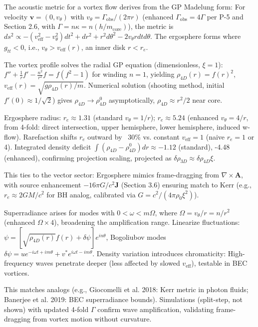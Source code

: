 \documentclass{article}
\begin{document}
The acoustic metric for a vortex flow derives from the GP Madelung form: For velocity $\mathbf{v} = (0, v_\theta)$ with $v_\theta = \Gamma_{\text{obs}} / (2\pi r)$ (enhanced $\Gamma_{\text{obs}} = 4 \Gamma$ per P-5 and Section 2.6, with $\Gamma = n \kappa = n (h / m_{\text{core}})$), the metric is $ds^2 \propto - (v_{\text{eff}}^2 - v_\theta^2) dt^2 + dr^2 + r^2 d\theta^2 - 2 v_\theta r dt d\theta$. The ergosphere forms where $g_{tt} < 0$, i.e., $v_\theta > v_{\text{eff}}(r)$, an inner disk $r < r_e$.

The vortex profile solves the radial GP equation (dimensionless, $\xi = 1$): $f'' + \frac{1}{r} f' - \frac{n^2}{r^2} f = f (f^2 - 1)$ for winding $n=1$, yielding $\rho_{4D}(r) = f(r)^2$, $v_{\text{eff}}(r) = \sqrt{g \rho_{4D}(r) / m}$. Numerical solution (shooting method, initial $f'(0) \approx 1/\sqrt{2}$) gives $\rho_{4D} \to \rho_{4D}^0$ asymptotically, $\rho_{4D} \approx r^2 / 2$ near core.

Ergosphere radius: $r_e \approx 1.31$ (standard $v_\theta = 1/r$); $r_e \approx 5.24$ (enhanced $v_\theta = 4/r$, from 4-fold: direct intersection, upper hemisphere, lower hemisphere, induced w-flow). Rarefaction shifts $r_e$ outward by ~30\% vs. constant $v_{\text{eff}}=1$ (naive $r_e=1$ or 4). Integrated density deficit $\int (\rho_{4D} - \rho_{4D}^0) dr \approx -1.12$ (standard), -4.48 (enhanced), confirming projection scaling, projected as $\delta \rho_{3D} \approx \delta \rho_{4D} \xi$.

This ties to the vector sector: Ergosphere mimics frame-dragging from $\nabla \times \mathbf{A}$, with source enhancement $-16\pi G / c^2 \mathbf{J}$ (Section 3.6) ensuring match to Kerr (e.g., $r_e \approx 2 G M / c^2$ for BH analog, calibrated via $G = c^2 / (4\pi \rho_0 \xi^2)$).

Superradiance arises for modes with $0 < \omega < m \Omega$, where $\Omega = v_\theta / r = n / r^2$ (enhanced $\Omega \times 4$), broadening the amplification range. Linearize fluctuations: $\psi = [\sqrt{\rho_{4D}(r)} f(r) + \delta \psi] e^{i n \theta}$, Bogoliubov modes $\delta\psi = u e^{-i\omega t + i m \theta} + v^* e^{i\omega t - i m \theta}$. Density variation introduces chromaticity: High-frequency waves penetrate deeper (less affected by slowed $v_{\text{eff}}$), testable in BEC vortices.

This matches analogs (e.g., Giocomelli et al. 2018: Kerr metric in photon fluids; Banerjee et al. 2019: BEC superradiance bounds). Simulations (split-step, not shown) with updated 4-fold $\Gamma$ confirm wave amplification, validating frame-dragging from vortex motion without curvature.
\end{document}
